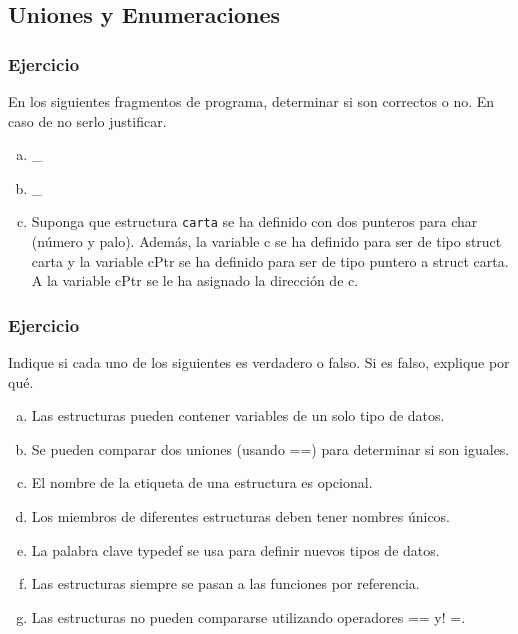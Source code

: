 \subsection*{Uniones y Enumeraciones}

\subsubsection{Ejercicio}
En los siguientes fragmentos de programa, determinar si son correctos o no. En caso de no serlo justificar.
\begin{enumerate}[a)]
  \item \_
  \lstset{inputencoding=utf8/latin1}
  
  \item \_
  \lstset{inputencoding=utf8/latin1}
  
  \item Suponga que estructura \texttt{carta} se ha definido con dos punteros para char (número y palo).
    Además, la variable c se ha definido para ser de tipo struct carta y la variable cPtr se ha definido para ser de tipo puntero a struct carta. 
    A la variable cPtr se le ha asignado la dirección de c.
  \lstset{inputencoding=utf8/latin1}
  
\end{enumerate}
\subsubsection{Ejercicio}
Indique si cada uno de los siguientes es verdadero o falso. Si es falso, explique por qué.
\begin{enumerate}[a)]
  \item Las estructuras pueden contener variables de un solo tipo de datos.
  \item Se pueden comparar dos uniones (usando ==) para determinar si son iguales.
  \item El nombre de la etiqueta de una estructura es opcional.
  \item Los miembros de diferentes estructuras deben tener nombres únicos.
  \item La palabra clave typedef se usa para definir nuevos tipos de datos.
  \item Las estructuras siempre se pasan a las funciones por referencia.
  \item Las estructuras no pueden compararse utilizando operadores == y! =.
\end{enumerate}

